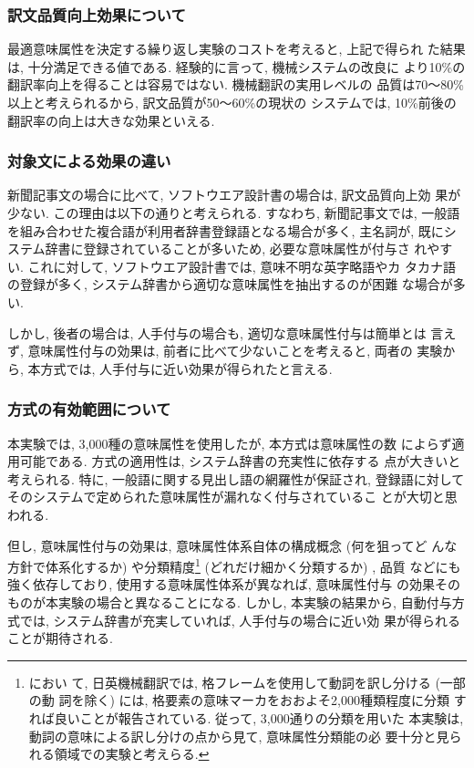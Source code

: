 \subsubsection{訳文品質向上効果について}

最適意味属性を決定する繰り返し実験のコストを考えると, 上記で得られ
た結果は, 十分満足できる値である. 経験的に言って, 機械システムの改良に
より10\%の翻訳率向上を得ることは容易ではない. 機械翻訳の実用レベルの
品質は70〜80\%以上と考えられるから, 訳文品質が50〜60\%の現状の
システムでは, 10\%前後の翻訳率の向上は大きな効果といえる. 

\subsubsection{対象文による効果の違い}
新聞記事文の場合に比べて, ソフトウエア設計書の場合は, 訳文品質向上効
果が少ない. この理由は以下の通りと考えられる. すなわち, 新聞記事文では, 
一般語を組み合わせた複合語が利用者辞書登録語となる場合が多く, 主名詞が, 
既にシステム辞書に登録されていることが多いため, 必要な意味属性が付与さ
れやすい. これに対して, ソフトウエア設計書では, 意味不明な英字略語やカ
タカナ語の登録が多く, システム辞書から適切な意味属性を抽出するのが困難
な場合が多い.  

しかし, 後者の場合は, 人手付与の場合も, 適切な意味属性付与は簡単とは
言えず, 意味属性付与の効果は, 前者に比べて少ないことを考えると, 両者の
実験から, 本方式では, 人手付与に近い効果が得られたと言える.  

\subsubsection{方式の有効範囲について}
本実験では, 3,000種の意味属性を使用したが, 本方式は意味属性の数
によらず適用可能である. 方式の適用性は, システム辞書の充実性に依存する
点が大きいと考えられる. 特に, 一般語に関する見出し語の網羅性が保証され, 
登録語に対してそのシステムで定められた意味属性が漏れなく付与されているこ
とが大切と思われる.  

但し, 意味属性付与の効果は, 意味属性体系自体の構成概念 (何を狙ってど
んな方針で体系化するか) や分類精度\footnote{におい
て, 日英機械翻訳では, 格フレームを使用して動詞を訳し分ける (一部の動
詞を除く) には, 格要素の意味マーカをおおよそ2,000種類程度に分類
すれば良いことが報告されている. 従って, 3,000通りの分類を用いた
本実験は, 動詞の意味による訳し分けの点から見て, 意味属性分類能の必
要十分と見られる領域での実験と考えらる. } (どれだけ細かく分類するか) , 品質
などにも強く依存しており, 使用する意味属性体系が異なれば, 意味属性付与
の効果そのものが本実験の場合と異なることになる. しかし, 本実験の結果から, 
自動付与方式では, システム辞書が充実していれば, 人手付与の場合に近い効
果が得られることが期待される.  


